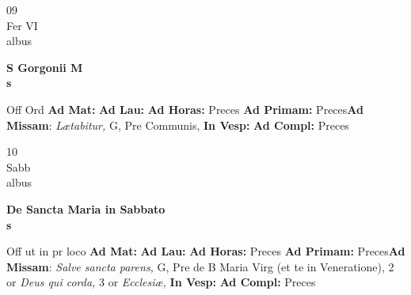 \documentclass[10pt, openany]{book}
\begin{document}
    \begin{center}
        \begin{minipage}{3.5in}
            \vspace{2em}
            \begin{minipage}{0.5in}
                {\Huge 09} \\
                {\normalsize Fer VI} \\
                {\normalsize albus}
            \end{minipage}
            \begin{minipage}{3.0in}
                \textbf{ \large S Gorgonii M \\
                \textnormal{\normalsize s}} \\ 
            \end{minipage}
            \begin{justify}Off Ord
                \textbf{Ad Mat: }
                \textbf{Ad Lau: }
                \textbf{Ad Horas: }Preces
                \textbf{Ad Primam: }Preces\textbf{Ad Missam}: \textit{Lætabitur,} G, Pre Communis,  
                \textbf{In Vesp: }
                \textbf{Ad Compl: }Preces
            \end{justify}
        \end{minipage}
    \end{center}

    \begin{center}
        \begin{minipage}{3.5in}
            \vspace{2em}
            \begin{minipage}{0.5in}
                {\Huge 10} \\
                {\normalsize Sabb} \\
                {\normalsize albus}
            \end{minipage}
            \begin{minipage}{3.0in}
                \textbf{ \large De Sancta Maria in Sabbato \\
                \textnormal{\normalsize s}} \\ 
            \end{minipage}
            \begin{justify}Off ut in pr loco
                \textbf{Ad Mat: }
                \textbf{Ad Lau: }
                \textbf{Ad Horas: }Preces
                \textbf{Ad Primam: }Preces\textbf{Ad Missam}: \textit{Salve sancta parens,} G, Pre de B Maria Virg (et te in Veneratione), 2 or \textit{Deus qui corda,} 3 or \textit{Ecclesiæ,}  
                \textbf{In Vesp: }
                \textbf{Ad Compl: }Preces
            \end{justify}
        \end{minipage}
    \end{center}
\end{document}
